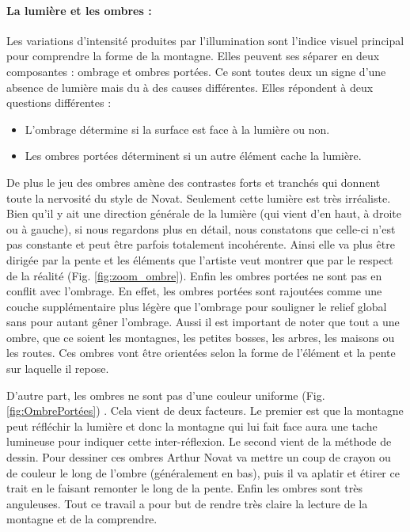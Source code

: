 \paragraph*{La lumière et les ombres :} 
Les variations d'intensité produites par l'illumination sont l'indice visuel principal pour comprendre la forme de la montagne. Elles peuvent ses séparer en deux composantes : ombrage et ombres portées. Ce sont toutes deux un signe d'une absence de lumière mais du à des causes différentes. Elles répondent à deux questions différentes : 
\begin{itemize}
\baselineskip=10pt
\item L'ombrage détermine si la surface est face à la lumière ou non. 
\item Les ombres portées déterminent si un autre élément cache la lumière. 
\end{itemize}
De plus le jeu des ombres amène des contrastes forts et tranchés qui donnent toute la nervosité du style de Novat. Seulement cette lumière est très irréaliste. Bien qu'il y ait une direction générale de la lumière (qui vient d'en haut, à droite ou à gauche), si nous regardons plus en détail, nous constatons que celle-ci n'est pas constante et peut être parfois totalement incohérente. Ainsi elle va plus être dirigée par la pente et les éléments que l'artiste veut montrer que par le respect de la réalité (Fig. \ref{fig:zoom_ombre}).
Enfin les ombres portées ne sont pas en conflit avec l'ombrage. En effet, les ombres portées sont rajoutées comme une couche supplémentaire plus légère que l'ombrage pour souligner le relief global sans pour autant gêner l'ombrage.  Aussi il est important de noter que tout a une ombre, que ce soient les montagnes, les petites bosses, les arbres, les maisons ou les routes. Ces ombres vont être orientées selon la forme de l’élément et la pente sur laquelle il repose.



D'autre part, les ombres ne sont pas d'une couleur uniforme (Fig. \ref{fig:OmbrePortées}) . Cela vient de deux facteurs. Le premier est que la montagne peut réfléchir la lumière et donc la montagne qui lui fait face aura une tache lumineuse pour indiquer cette inter-réflexion. Le second vient de la méthode de dessin. Pour dessiner ces ombres Arthur Novat va mettre un coup de crayon ou de couleur le long de l'ombre (généralement en bas), puis il va aplatir et étirer ce trait en le faisant remonter le long de la pente. Enfin les ombres sont très anguleuses. 
Tout ce travail a pour but de rendre très claire la lecture de la montagne et de la comprendre.









